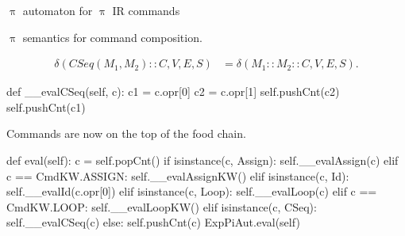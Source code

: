 \documentclass{beamer}
\begin{document}
\begin{frame}{{\color{red}$\uppi$ automaton} for {\color{red}$\uppi$ IR} commands}
\framebreak

{\color{red}$\uppi$}  semantics for command composition.

\begin{scriptsize}
\begin{align}
\delta(CSeq(M_1, M_2) :: C, V, E, S) & = \delta(M_1 :: M_2 :: C, V, E, S). \nonumber
\end{align}
\end{scriptsize}

\begin{python}
    def __evalCSeq(self, c):
        c1 = c.opr[0]
        c2 = c.opr[1]
        self.pushCnt(c2)
        self.pushCnt(c1)
\end{python}

\framebreak

Commands are now on the top of the food chain.

\begin{python}
    def eval(self): 
        c = self.popCnt()
        if isinstance(c, Assign):
            self.__evalAssign(c)
        elif c == CmdKW.ASSIGN:
            self.__evalAssignKW()
        elif isinstance(c, Id):
            self.__evalId(c.opr[0])
        elif isinstance(c, Loop):
            self.__evalLoop(c)
        elif c == CmdKW.LOOP:
            self.__evalLoopKW()
        elif isinstance(c, CSeq):
            self.__evalCSeq(c)
        else:
            self.pushCnt(c)
            ExpPiAut.eval(self)
\end{python}
\end{frame}

\end{document}
